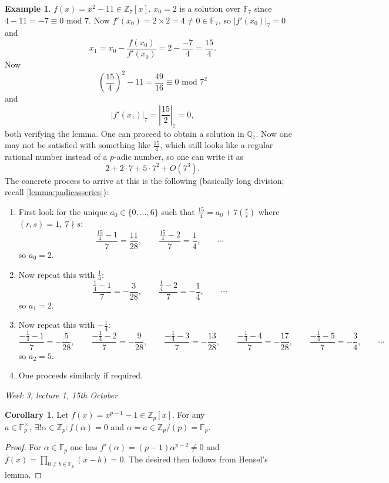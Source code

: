 \documentclass{article}
\newcommand{\F}{\mathbb{F}}
\newcommand{\Z}{\mathbb{Z}}
\newcommand{\Q}{\mathbb{Q}}
\newcommand{\Mod}{\text{ mod }}
\theoremstyle{definition}
\newtheorem{coro}[defn]{Corollary}
\newtheorem{example}[defn]{Example}
\begin{document}
\begin{example}
$f(x)=x^2-11\in\Z_7[x]$. $x_0=2$ is a solution over $\F_7$ since $4-11=-7\equiv 0\Mod 7$. Now $f'(x_0)=2\times 2=4\neq 0\in\F_7$, so $|f'(x_0)|_7=0$ and
\[
x_1=x_0-\frac{f(x_0)}{f'(x_0)}=2-\frac{-7}{4}=\frac{15}{4}.
\]
Now
\[
\left(\frac{15}{4}\right)^2-11=\frac{49}{16}\equiv 0\Mod 7^2
\]
and
\[
|f'(x_1)|_7=\left|\frac{15}{2}\right|_7=0,
\]
both verifying the lemma. One can proceed to obtain a solution in $\Q_7$. Now one may not be satisfied with something like $\frac{15}{4}$, which still looks like a regular rational number instead of a $p$-adic number, so one can write it as
\[
2+2\cdot 7+5\cdot 7^2+O(7^3).
\]
The concrete process to arrive at this is the following (basically long division; recall \ref{lemma:padicasseries}):
\begin{enumerate}
\item First look for the unique $a_0\in\{0,\ldots,6\}$ such that $\frac{15}{4}=a_0+7\left(\frac{r}{s}\right)$ where $(r,s)=1,\ 7\nmid s$:
\[
\frac{\frac{15}{4}-1}{7}=\frac{11}{28},\qquad
\frac{\frac{15}{4}-2}{7}=\frac{1}{4},\qquad\cdots
\]
so $a_0=2$.
\item Now repeat this with $\frac14$:
\[
\frac{\frac14-1}{7}=-\frac{3}{28},\qquad \frac{\frac14-2}{7}=-\frac{1}{4},\qquad\cdots
\]
so $a_1=2$.
\item Now repeat this with $-\frac14$:
\[
\frac{-\frac14-1}{7}=-\frac{5}{28},\qquad \frac{-\frac14-2}{7}=-\frac{9}{28},\qquad \frac{-\frac14-3}{7}=-\frac{13}{28},\qquad \frac{-\frac14-4}{7}=-\frac{17}{28},\qquad \frac{-\frac14-5}{7}=-\frac{3}{4},\qquad\cdots
\]
so $a_2=5$.
\item One proceeds similarly if required.
\end{enumerate}
\end{example}

\begin{flushright}
\textit{Week 3, lecture 1, 15th October}
\end{flushright}

\begin{coro}
Let $f(x)=x^{p-1}-1\in\Z_p[x]$. For any $a\in\F_p^\times,\ \exists!\alpha\in\Z_p:f(\alpha)=0$ and $\alpha=a\in\Z_p/(p)=\F_p$.
\end{coro}
\begin{proof}
For $\alpha\in\F_p$ one has $f'(\alpha)=(p-1)\alpha^{p-2}\neq 0$ and $\overline f(x)=\prod_{0\neq b\in\F_p}(x-b)=0$. The desired then follows from Hensel's lemma.
\end{proof}
\end{document}
